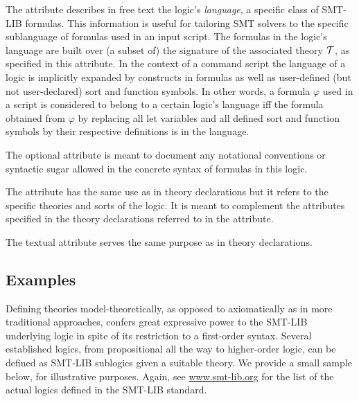 The  attribute describes in free text the logic's
\emph{language}, a specific class of SMT-LIB formulas.
This information is useful for tailoring SMT solvers 
to the specific sublanguage of formulas used in an input script.
The formulas in the logic's language are built over (a subset of) 
the signature of the associated theory $\mathcal{T}$, as specified in this attribute.
In the context of a command script the language of a logic 
is implicitly expanded by  constructs in formulas as well as 
user-defined (but not user-declared) sort and function symbols.
In other words, a formula $\varphi$ used in a script is considered to belong 
to a certain logic's language
iff
the formula obtained from $\varphi$ by replacing all let variables and 
all defined sort and function symbols by their respective definitions
is in the language.

The optional  attribute is meant 
to document any notational conventions or syntactic sugar allowed in
the concrete syntax of formulas in this logic.

The  attribute has the same use as in theory declarations
but it refers to the specific theories and sorts of the logic.
It is meant to complement the  attributes specified in
the theory declarations referred to in the  attribute.

The textual  attribute serves the same purpose as in theory declarations. 


\subsection{Examples}

Defining theories model-theoretically, as opposed to axiomatically 
as in more traditional approaches, confers great expressive power 
to the SMT-LIB underlying logic in spite of its restriction 
to a first-order syntax.
Several established logics, from propositional all the way to higher-order logic, 
can be defined as SMT-LIB sublogics given a suitable theory.
We provide a small sample below, for illustrative purposes.
Again, see \href{http://www.smt-lib.org}{www.smt-lib.org} for the list 
of the actual logics defined in the SMT-LIB standard. 



